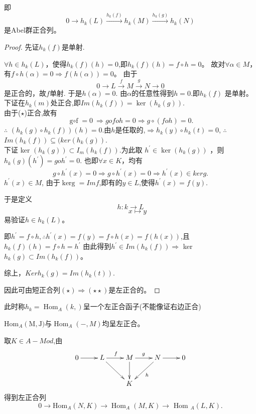\documentclass[UTF8]{article}
\begin{document}
即
$$0 \rightarrow h_{k}(L)\stackrel{h_k(f)}{\longrightarrow}h_{k}(M)\stackrel{h_k(g)}{\longrightarrow} h_{k}(N)$$
是Abel群正合列。

\begin{proof}
	先证$h_{k}(f)$是单射.
	
	
	$\forall h \in h_{k}(L)$，使得$h_{k}(f)(h)=0$,即$h_{k}(f)(h)=f\circ h=0$。
	故对$\forall \alpha \in M$，有$f\circ h(\alpha)=0 \Rightarrow f(h(\alpha))=0$。	
	由于
	$$0 \rightarrow L 	\stackrel{f}{\longrightarrow}  M 	\stackrel{g}{\longrightarrow}  N \rightarrow 0$$
	是正合的，故$f$单射.
	于是$h(\alpha)=0$. 由$\alpha$的任意性得到$h=0$.即$h_{k}(f)$ 是单射。\\
	
	
	下证在$h_{k}(m)$处正合,即$Im\left(h_{k}(f)\right)=\operatorname{ker}\left(h_{k}(g)\right)$.\\
	由于($\star$)正合,故有$$ \operatorname{g\circ f}=0\ \Rightarrow g o f o h=0\Rightarrow g\circ (foh)=0.$$
	$\therefore $ $(h_{k}(g)\circ h_{k}(f))(h)=0$.由$h$是任取的,$\Rightarrow h_{k}(y) \circ h_{k}(t)=0$,
	$\therefore$  $Im(h_{k}(f)) \subseteq (ker(h_{k}(g))$.\\
	
	下证 ker $\left(h_{k}(g)\right) \subset I_{m}\left(h_{k}(f)\right).$为此取 $h^{\prime} \in \operatorname{ker}\left(h_{k}(g)\right)$%
	，则$h_{k}(g)\left(h^{\prime}\right)=go h^{\prime}=0.$
	也即$\forall x \in K$，均有
	$$ g\circ h^{\prime}(x)=0\Rightarrow g\circ h^{\prime}(x)=0\Rightarrow h^{\prime}(x) \in ker g.$$
	$h^{\prime}(x) \in M$, 由于$\operatorname{ker g}=Imf$,即有的$y\in L$,使得$h^{\prime}(x)=f(y)$.
	
	于是定义
	$$h:k \rightarrow L$$
	$$\qquad x\mapsto y$$
	易验证$h \in h_{k}(L)$。
	
	即$h^{\prime}=f\circ h ,\therefore h^{\prime}(x)=f(y)=f\circ h(x)=f(h(x))$,且$h_{k}(f)(h)=f\circ  h=h^{\prime}$
	由此得到$ h^{\prime} \in Im(h_{k}(f))\Rightarrow$ ker $h_{k}(g) \subset Im(h_{k}(f))$。
	
	综上，$Kerh_k(g)=Im(h_k(t)).$
	
	因此可由短正合列$(\star)\Rightarrow(\star \star)$是左正合的。
\end{proof}
此时称$h_{k}=\operatorname{Hom}_{A}\left(k,\right)$呈一个左正合函子(不能像证右边正合)

$\mathrm{Hom}_{A}\left(\mathrm{M},\mathrm{J})\right.$与$\operatorname{Hom}_{A}(-, M)$均呈左正合。

取$K\in A-Mod$,由
$$
\xymatrix{
	0\ar[r]&L\ar[r]^{f}\ar[rd]&M\ar[r]^{g}\ar[d]&N\ar[ld]^{h}\ar[r]&0\\
	& & K & &\\
}
$$
得到左正合列
\[
0 \rightarrow \mathrm{Hom}_{A}(N, K) \rightarrow \operatorname{Hom}_{A}(M, K)\rightarrow \text { Hom }_{A}(L,K).
\]
\end{document}
